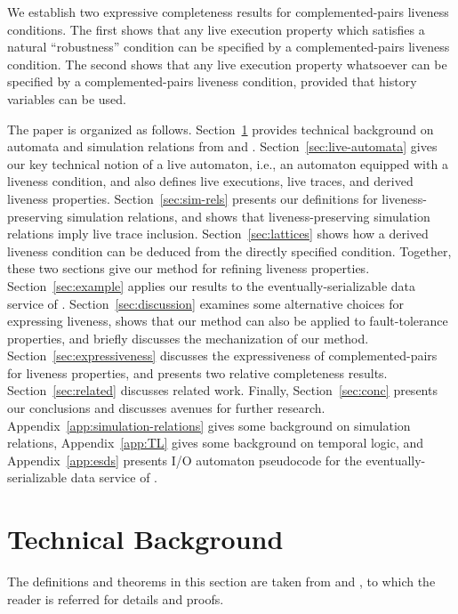 \documentclass[11pt]{article}
\begin{document}
We establish two expressive completeness results for 
complemented-pairs liveness conditions. The first shows that any live execution
property which satisfies a natural ``robustness'' condition can be
specified by a complemented-pairs liveness condition. The second shows that any
live execution property whatsoever can be specified by a
complemented-pairs liveness condition, provided that history variables can be
used.

The paper is organized as follows.
Section~\ref{sec:background} provides technical background on automata
and simulation relations from
\cite{GSSL93} and \cite{LV95}.  Section~\ref{sec:live-automata} gives
our key technical notion of a live automaton, i.e., an automaton
equipped with a liveness condition, and also defines live executions,
live traces, and derived liveness properties.
Section~\ref{sec:sim-rels} presents our definitions for
liveness-preserving simulation relations, and shows that
liveness-preserving simulation relations
imply live trace inclusion.  Section~\ref{sec:lattices}
shows how a derived liveness condition can be deduced from the directly
specified condition. Together, these two sections give our
method for refining liveness properties.
Section~\ref{sec:example} applies our
results to the eventually-serializable data service of \cite{FGLLS99,LLSG92}.
Section~\ref{sec:discussion} examines some
alternative choices for expressing liveness, shows that our method
can also be applied to fault-tolerance properties, and briefly discusses the
mechanization of our method. 
Section~\ref{sec:expressiveness} discusses the expressiveness of complemented-pairs
for liveness properties, and presents two relative completeness results.
Section~\ref{sec:related} discusses related work.  Finally,
Section~\ref{sec:conc} presents our conclusions and discusses avenues
for further research.
Appendix~\ref{app:simulation-relations} gives some background on
simulation relations,
Appendix~\ref{app:TL} gives some background on temporal logic, and
Appendix~\ref{app:esds} presents I/O automaton pseudocode for the 
eventually-serializable data service of \cite{FGLLS99,LLSG92}.


\section{Technical Background}
\label{sec:background}

The definitions and theorems in this section are taken from \cite{GSSL93} and
\cite{LV95}, to which the reader is referred for details and proofs.
\end{document}
